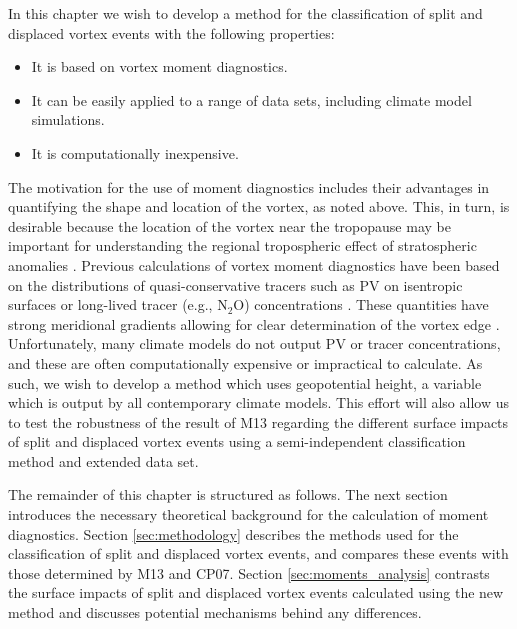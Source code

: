 In this chapter we wish to develop a method for the classification of split and
displaced vortex events with the following properties:
\begin{itemize}
\item It is based on vortex moment diagnostics.
\item It can be easily applied to a range of data sets, including climate model
  simulations.
\item It is computationally inexpensive. 
\end{itemize}
The motivation for the use of moment diagnostics includes their advantages in
quantifying the shape and location of the vortex, as noted above. This, in turn,
is desirable because the location of the vortex near the tropopause may be
important for understanding the regional tropospheric effect of stratospheric
anomalies \citep[e.g.,][Section \ref{sec:mechanisms}]{Ambaum2002}. Previous
calculations of vortex moment diagnostics have been based on the distributions
of quasi-conservative tracers such as PV on isentropic surfaces
\citep{Mitchell2011} or long-lived tracer (e.g., N$_{2}$O) concentrations
\citep{Waugh1997}. These quantities have strong meridional gradients allowing
for clear determination of the vortex edge \citep{Nash1996}. Unfortunately, many
climate models do not output PV or tracer concentrations, and these are often
computationally expensive or impractical to calculate. As such, we wish to
develop a method which uses geopotential height, a variable which is output by
all contemporary climate models. This effort will also allow us to test the
robustness of the result of M13 regarding the different surface impacts of split
and displaced vortex events using a semi-independent classification method and
extended data set.

The remainder of this chapter is structured as follows. The next section
introduces the necessary theoretical background for the calculation of moment
diagnostics. Section \ref{sec:methodology} describes the methods used for the
classification of split and displaced vortex events, and compares these events
with those determined by M13 and CP07. Section \ref{sec:moments_analysis}
contrasts the surface impacts of split and displaced vortex events calculated
using the new method and discusses potential mechanisms behind any differences. 


